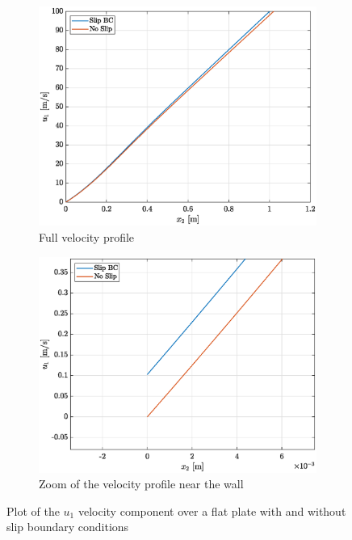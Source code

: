 \documentclass{ucb}
\begin{document}
\begin{figure}[H]
    \centering
    \begin{subfigure}{0.45\textwidth}
        \includegraphics[width = \textwidth]{img/comp1.eps}
        \caption{Full velocity profile}
        \label{fig:plotnorm}
    \end{subfigure}
    \begin{subfigure}{0.45\textwidth}
        \includegraphics[width = \textwidth]{img/comp1_zoom.eps}
        \caption{Zoom of the velocity profile near the wall}
        \label{fig:plotzoom}
    \end{subfigure}
    \caption{Plot of the $u_1$ velocity component over a flat plate with and without slip boundary conditions}
    \label{fig:plot}
\end{figure}
\end{document}
